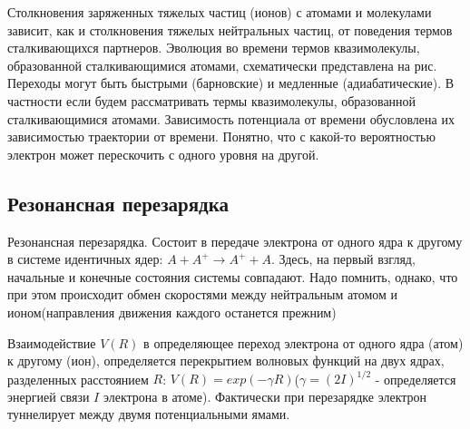 \documentclass[10pt, a4paper]{article}
\begin{document}
Столкновения заряженных тяжелых частиц (ионов) с атомами и молекулами зависит, как и столкновения тяжелых нейтральных частиц, от поведения термов сталкивающихся партнеров. Эволюция во времени термов квазимолекулы, образованной сталкивающимися атомами, схематически представлена на рис. 
Переходы могут быть быстрыми (барновские) и медленные (адиабатические). В частности если будем рассматривать термы квазимолекулы, образованной сталкивающимися атомами. Зависимость потенциала от времени обусловлена их зависимостью траектории от времени.
Понятно, что с какой-то вероятностью электрон может перескочить с одного уровня на другой.

\begin{figure}[h!]
\end{figure}



\subsection{Резонансная перезарядка}
\label{sec.2.5}

Резонансная перезарядка. Состоит в передаче электрона от одного ядра к другому в системе идентичных ядер: $A + A^{+} \rightarrow A^{+} + A$. Здесь, на первый взгляд, начальные и конечные состояния системы совпадают. Надо помнить, однако, что при этом происходит обмен скоростями между нейтральным атомом и ионом(направления движения каждого останется прежним)

Взаимодействие $V(R)$ в  определяющее переход электрона от одного ядра (атом) к другому (ион), определяется перекрытием волновых функций на двух ядрах, разделенных  
расстоянием $R$: $V(R)=exp(-\gamma R)$($\gamma=(2I)^{1/2}$ - определяется энергией связи $I$ электрона в атоме). Фактически при перезарядке электрон туннелирует между двумя потенциальными ямами.
\end{document}

